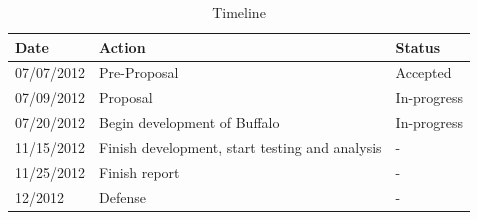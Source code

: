 \begin{table}[H]
\centering
\begin{tabular}{|l|l|l|}
\hline
Date & Action & Status\\
\hline
07/07/2012 & Pre-Proposal & Accepted\\
07/09/2012 & Proposal & In-progress\\
07/20/2012 & Begin development of Buffalo & In-progress\\
11/15/2012 & Finish development, start testing and analysis & - \\
11/25/2012 & Finish report & - \\
12/2012 & Defense & - \\
\hline
\end{tabular}
\caption{Timeline}
\label{tab:roadmap_tbl}
\end{table}


%

\singlespacing




